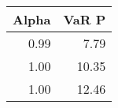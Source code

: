 \begin{tabular}{rr}
\toprule
 Alpha &  VaR P \\
\midrule
  0.99 &   7.79 \\
  1.00 &  10.35 \\
  1.00 &  12.46 \\
\bottomrule
\end{tabular}
